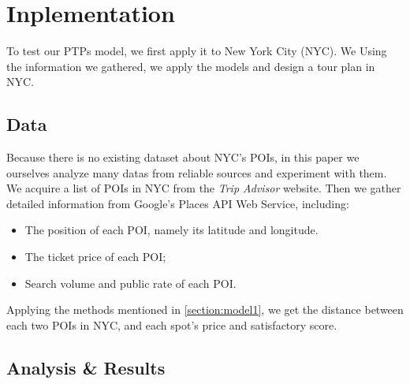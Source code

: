 \documentclass{mcmthesis}
\begin{document}
\section{Inplementation}
  To test our PTPs model, we first apply it to New York City (NYC). We Using the information we gathered, we apply the models and design a tour plan in NYC.
\subsection{Data}
  Because there is no existing dataset about NYC's POIs, in this paper we ourselves analyze many datas from reliable sources and experiment with them. We acquire a list of POIs in NYC from the \emph{Trip Advisor} website\cite{TripAdv}. Then we gather detailed information from Google's Places API Web Service\cite{GMaps}, including:
  \begin{itemize}
    \item The position of each POI, namely its latitude and longitude.
    \item The ticket price of each POI;
    \item Search volume and public rate of each POI.
  \end{itemize}
  Applying the methods mentioned in \ref{section:model1}, we get the distance between each two POIs in NYC, and each spot's price and satisfactory score. 
\subsection{Analysis \& Results}
\end{document}
